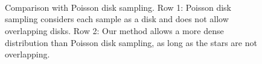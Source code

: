   \begin{figure}[!htb]
  \centering
  \\
  \\
  \\
   
  \caption{Comparison with Poisson disk sampling.
  Row 1: Poisson disk sampling considers each sample as a disk and does not allow overlapping disks.
  Row 2: Our method allows a more dense distribution than Poisson disk sampling, as long as the stars are not overlapping.
  }
  \label{fig:comparetopoissondisk}
  \end{figure}


